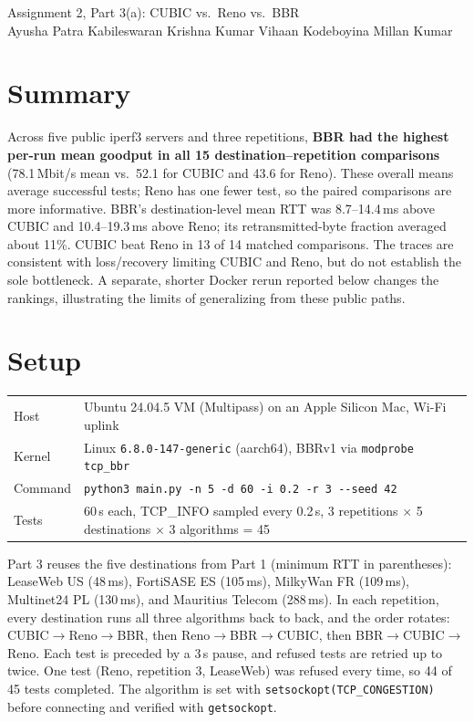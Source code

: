 \documentclass[11pt]{article}
\begin{document}
\begin{center}
{\Large Assignment 2, Part 3(a): CUBIC vs.\ Reno vs.\ BBR}\\[0.5em]
{\small Ayusha Patra \quad Kabileswaran Krishna Kumar \quad
Vihaan Kodeboyina \quad Millan Kumar}
\end{center}

\section*{Summary}

Across five public iperf3 servers and three repetitions, \textbf{BBR had the
highest per-run mean goodput in all 15 destination--repetition comparisons}
(78.1\,Mbit/s mean vs.\ 52.1 for CUBIC and 43.6 for Reno). These overall
means average successful tests; Reno has one fewer test, so the paired
comparisons are more informative. BBR's destination-level mean RTT was
8.7--14.4\,ms above CUBIC and 10.4--19.3\,ms above Reno; its retransmitted-byte
fraction averaged about 11\%. CUBIC beat Reno in 13 of 14 matched comparisons.
The traces are consistent with loss/recovery limiting CUBIC and Reno, but do
not establish the sole bottleneck. A separate, shorter Docker rerun reported
below changes the rankings, illustrating the limits of generalizing from
these public paths.

\section*{Setup}

\begin{tabularx}{\textwidth}{@{}lX@{}}
\toprule
Host & Ubuntu 24.04.5 VM (Multipass) on an Apple Silicon Mac, Wi-Fi uplink \\
Kernel & Linux \texttt{6.8.0-147-generic} (aarch64), BBRv1 via
  \texttt{modprobe tcp\_bbr} \\
Command & \texttt{python3 main.py -n 5 -d 60 -i 0.2 -r 3 -{}-seed 42} \\
Tests & 60\,s each, TCP\_INFO sampled every 0.2\,s, 3 repetitions
  $\times$ 5 destinations $\times$ 3 algorithms = 45 \\
\bottomrule
\end{tabularx}

Part 3 reuses the five destinations from Part 1 (minimum RTT in
parentheses): LeaseWeb US (48\,ms), FortiSASE ES (105\,ms), MilkyWan FR
(109\,ms), Multinet24 PL (130\,ms), and Mauritius Telecom (288\,ms). In each
repetition, every destination runs all three algorithms back to back, and the
order rotates: CUBIC$\rightarrow$Reno$\rightarrow$BBR, then
Reno$\rightarrow$BBR$\rightarrow$CUBIC, then BBR$\rightarrow$CUBIC$\rightarrow$Reno.
Each test is preceded by a 3\,s pause, and refused tests are retried up to
twice. One test (Reno, repetition 3, LeaseWeb) was refused every time, so
44 of 45 tests completed. The algorithm is set with
\texttt{setsockopt(TCP\_CONGESTION)} before connecting and verified with
\texttt{getsockopt}.
\end{document}
